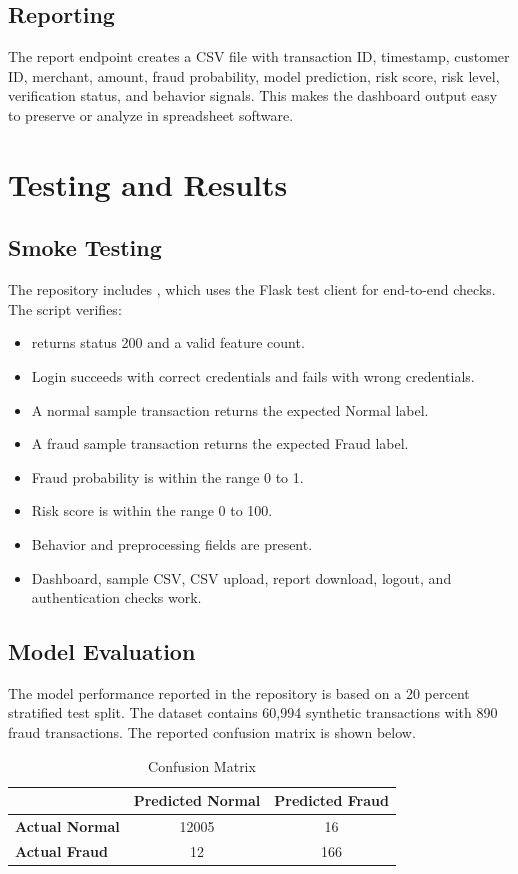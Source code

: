 \documentclass[12pt,a4paper]{report}
\begin{document}
\section{Reporting}
The report endpoint creates a CSV file with transaction ID, timestamp, customer ID, merchant, amount, fraud probability, model prediction, risk score, risk level, verification status, and behavior signals. This makes the dashboard output easy to preserve or analyze in spreadsheet software.

\chapter{Testing and Results}

\section{Smoke Testing}
The repository includes , which uses the Flask test client for end-to-end checks. The script verifies:
\begin{itemize}
    \item {} returns status 200 and a valid feature count.
    \item Login succeeds with correct credentials and fails with wrong credentials.
    \item A normal sample transaction returns the expected Normal label.
    \item A fraud sample transaction returns the expected Fraud label.
    \item Fraud probability is within the range 0 to 1.
    \item Risk score is within the range 0 to 100.
    \item Behavior and preprocessing fields are present.
    \item Dashboard, sample CSV, CSV upload, report download, logout, and authentication checks work.
\end{itemize}

\section{Model Evaluation}
The model performance reported in the repository is based on a 20 percent stratified test split. The dataset contains 60,994 synthetic transactions with 890 fraud transactions. The reported confusion matrix is shown below.

\begin{table}[H]
\centering
\caption{Confusion Matrix}
\begin{tabular}{lcc}
\toprule
 & \textbf{Predicted Normal} & \textbf{Predicted Fraud} \\
\midrule
\textbf{Actual Normal} & 12005 & 16 \\
\textbf{Actual Fraud} & 12 & 166 \\
\bottomrule
\end{tabular}
\end{table}
\end{document}
